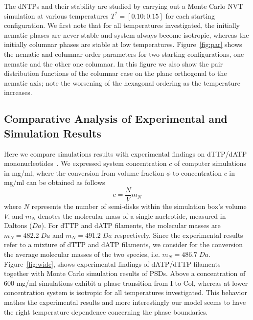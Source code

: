 \documentclass[aip,jcp, amsmath, amssymb, reprint]{revtex4-1}
\begin{document}
The dNTPs and their stability are studied by carrying out a Monte Carlo NVT simulation at various temperatures
$T^*=[0.10:0.15]$ for each starting configuration. We first note that for all temperatures investigated, the initially
nematic phases are never stable and system always become isotropic, whereas the initially columnar phases are stable at
low temperatures.  Figure~\ref{fig:par} shows the nematic and columnar order parameters for two starting
configurations, one nematic and the other one columnar. In this figure we also show the pair  distribution functions of
the columnar case on the plane orthogonal to the nematic axis; note the worsening of the hexagonal ordering as the
temperature increases.


\subsection{Comparative Analysis of Experimental and Simulation Results}

Here we compare simulations results with experimental findings on dTTP/dATP mononucleotides~\cite{Smith}.
We expressed system concentration $c$ of computer simulations in mg/ml, where the conversion 
from volume fraction $\phi$ to concentration $c$ in mg/ml can be obtained as follows
\begin{equation}
	c=\frac{N}{V}m_N
	\label{conc}
\end{equation}
where $N$ represents the number of semi-disks within the simulation box's volume $V$, and $m_N$ denotes the molecular mass of a single nucleotide, measured in Daltons ($Da$). For dTTP and dATP filaments, the molecular masses are $m_N=482.2\; Da$ and $m_N=491.2\; Da$ respectively. Since the experimental results refer to a mixture of dTTP and dATP filaments, we consider for
the conversion the average molecular masses of the two species, i.e. $m_N=486.7\; Da$. 
Figure~\ref{fig:wide}, shows experimental 
findings of dATP/dTTP filaments~\cite{Smith} together with Monte Carlo simulation results of PSDs. 
Above a concentration of 600 mg/ml simulations exhibit a phase transition from I to Col, whereas at lower concentration
system is isotropic for all temperatures investigated. This behavior mathes the experimental results and more interestingly
our model seems to have the right temperature dependence concerning the phase boundaries.
\end{document}
